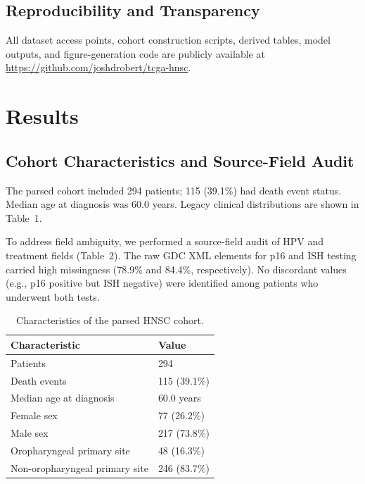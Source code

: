 \documentclass[11pt]{article}
\begin{document}
\subsection{Reproducibility and Transparency}
All dataset access points, cohort construction scripts, derived tables, model outputs, and figure-generation code are publicly available at \url{https://github.com/joshdrobert/tcga-hnsc}.

\section{Results}
\subsection{Cohort Characteristics and Source-Field Audit}
The parsed cohort included 294 patients; 115 (39.1\%) had death event status. Median age at diagnosis was 60.0 years. Legacy clinical distributions are shown in Table~1.

To address field ambiguity, we performed a source-field audit of HPV and treatment fields (Table~2). The raw GDC XML elements for p16 and ISH testing carried high missingness (78.9\% and 84.4\%, respectively). No discordant values (e.g., p16 positive but ISH negative) were identified among patients who underwent both tests.

\begin{table}[H]
\centering
\caption{Characteristics of the parsed HNSC cohort.}
\begin{tabular}{ll}
\toprule
Characteristic & Value \\
\midrule
Patients & 294 \\
Death events & 115 (39.1\%) \\
Median age at diagnosis & 60.0 years \\
Female sex & 77 (26.2\%) \\
Male sex & 217 (73.8\%) \\
Oropharyngeal primary site & 48 (16.3\%) \\
Non-oropharyngeal primary site & 246 (83.7\%) \\
\bottomrule
\end{tabular}
\end{table}
\end{document}
